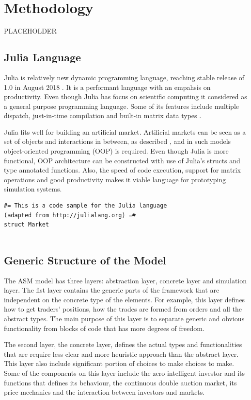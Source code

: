 
\section{Methodology}
PLACEHOLDER
\subsection{Julia Language}
Julia is relatively new dynamic programming language, 
reaching stable release of 1.0 in August 2018 \citep{JuliaV1}.
It is a performant language with an empahsis
on productivity. Even though Julia has focus on scientific 
computing it considered as a general purpose programming
language. Some of its features include
multiple dispatch, just-in-time compilation and built-in
matrix data types \citep{Julia}.

Julia fits well for building an artificial market.
Artificial markets can be seen as a set of objects
and interactions in between, as described \citet{Ben12},
and in such models object-oriented programming (OOP)
is required. Even though Julia is more functional, OOP
architecture can be constructed with use of Julia's 
structs and type annotated functions. Also, the 
speed of code execution, support for matrix operations 
and good productivity makes it viable language for 
prototyping simulation systems. 


\begin{lstlisting}
#= This is a code sample for the Julia language
(adapted from http://julialang.org) =#
struct Market
    
\end{lstlisting}


\subsection{Generic Structure of the Model}
The ASM model has three layers: abstraction layer, concrete 
layer and simulation layer. The fist layer contains the 
generic parts of the framework that are independent on the concrete
type of the elements. For example, this layer defines how 
to get traders' positions, how the trades are formed from
orders and all the abstract types. The main purpose of this layer
is to separate generic and obvious functionality from blocks of code
that has more degrees of freedom.

The second layer, the concrete layer, defines the actual types and
functionalities that are require less clear and more heuristic
approach than the abstract layer. This layer also include significant
portion of choices to make choices to make. Some of the components
on this layer include the zero intelligent investor and its
functions that defines its behaviour, the continuous double auction
market, its price mechanics and the interaction between investors
and markets.

